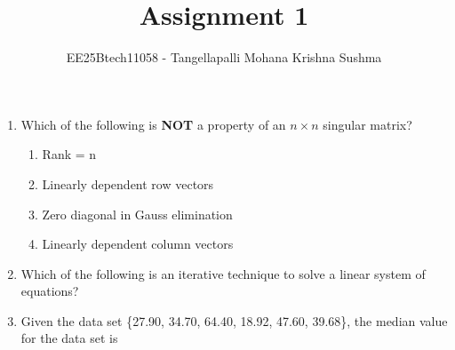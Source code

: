 \documentclass[journal,12pt,onecolumn]{IEEEtran}
\theoremstyle{remark}
\begin{document}
\title{Assignment 1}
\author{EE25Btech11058 - Tangellapalli Mohana Krishna Sushma}
\maketitle
\renewcommand{\thefigure}{\theenumi}
\renewcommand{\thetable}{\theenumi}
\begin{enumerate}

    \item Which of the following is \textbf{NOT} a property of an $n \times n$ singular matrix?  
    \hfill{}
    \begin{enumerate}[label=(\Alph*)]
        \item Rank = n
        \item Linearly dependent row vectors
        \item Zero diagonal in Gauss elimination
        \item Linearly dependent column vectors
    \end{enumerate}

    \item Which of the following is an iterative technique to solve a linear system of equations? 
    \hfill{}
    \begin{enumerate}[label=(\Alph*)]
    \end{enumerate}

    \item Given the data set \{27.90, 34.70, 64.40, 18.92, 47.60, 39.68\}, the median value for the data set is 
    \hfill{}
    \begin{enumerate}[label=(\Alph*)]
    \end{enumerate}


\end{enumerate}
\end{document}
